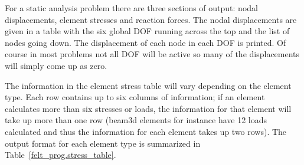 For a static analysis problem there are three sections of 
output: nodal displacements, element stresses and reaction forces.  
The nodal displacements are given in a table with the six global DOF
running across the top and the list of nodes going down.  The displacement 
of each node in each DOF is printed.  Of course in most problems not all 
DOF will be active so many of the displacements will simply come up as zero.

The information in the element stress table will vary depending on the 
element type.  Each row contains up to six columns of information; if an 
element calculates more than six stresses or loads, the information for that 
element will take up more than one row (beam3d elements for instance have 
12 loads calculated and thus the information for each element takes up two 
rows).  The output format for each element type is summarized in 
Table~\ref{felt_prog.stress_table}.


